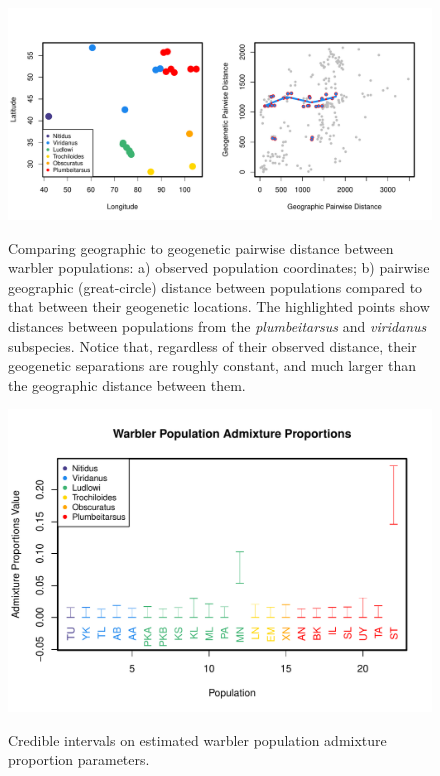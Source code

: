 \documentclass[10pt,letterpaper]{article}
\begin{document}
\begin{figure}
\centering
	{\includegraphics[width=\textwidth]{../figs/warblers/warb_pop_dist_compare.pdf}}
	\caption{
    Comparing geographic to geogenetic pairwise distance between warbler populations: a) observed population coordinates; b) pairwise geographic (great-circle) distance between populations compared to that between their geogenetic locations.  The highlighted points show distances between populations from the \textit{plumbeitarsus} and \textit{viridanus} subspecies.  Notice that, regardless of their observed distance, their geogenetic separations are roughly constant, and much larger than the geographic distance between them.
    }
	\label{sfig:warb_pop_distcomp}
\end{figure}

\begin{figure}
\centering
	{\includegraphics[width=\textwidth]{../figs/warblers/warb_pop_adprop.pdf}}
	\caption{Credible intervals on estimated warbler population admixture proportion parameters.}\label{sfig:warb_pop_adprop}
\end{figure}
\end{document}

